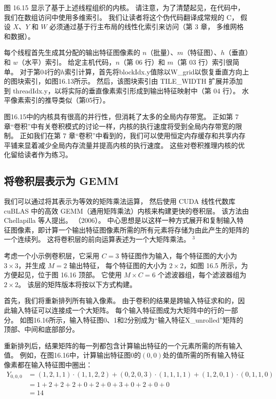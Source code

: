图 16.15 显示了基于上述线程组织的内核。 请注意，为了清楚起见，在代码中，我们在数组访问中使用多维索引。 
我们让读者将这个伪代码翻译成常规的 $\mathrm{C}$，
假设 $X、Y$ 和 $W$ 必须通过基于行主布局的线性化索引来访问（第 3 章， 多维网格和数据）。

每个线程首先生成其分配的输出特征图像素的 $n$（批量）、$m$（特征图）、$h$（垂直）和 $w$（水平）索引。 
给定主机代码，$n$（第 06 行）和 $m$（第 03 行）索引很简单。 
对于第04行的$h$索引计算，首先将blockIdx.y值除以W\_grid以恢复垂直方向上的图块索引，如图16.13所示。 
然后，该图块索引由 TILE\_WIDTH 扩展并添加到 threadIdx.y，以将实际的垂直像素索引形成到输出特征映射中（第 04 行）。 
水平像素索引的推导类似（第05行）。

图16.15中的内核具有很高的并行性，但消耗了太多的全局内存带宽。 
正如第 7 章“卷积”中有关卷积模式的讨论一样，内核的执行速度将受到全局内存带宽的限制。 
正如我们在第 7 章“卷积”中看到的，我们可以使用恒定内存缓存和共享内存平铺来显着减少全局内存流量并提高内核的执行速度。 
这些对卷积推理内核的优化留给读者作为练习。

\subsection{将卷积层表示为 GEMM}
我们可以通过将其表示为等效的矩阵乘法运算，
然后使用 CUDA 线性代数库 cuBLAS 中的高效 GEMM（通用矩阵乘法）内核来构建更快的卷积层。 
该方法由 Chellapilla 等人提出。 （2006）。 
中心思想是以这样一种方式展开和复制输入特征图像素，即计算一个输出特征图像素所需的所有元素将存储为由此产生的矩阵的一个连续列。 
这将卷积层的前向运算表述为一个大矩阵乘法。 ${}^{3}$

考虑一个小示例卷积层，它采用 $C=3$ 特征图作为输入，每个特征图的大小为 $3 \times 3$，并生成 $M=2$ 输出特征，
每个特征图的大小为 $2 \times 2 $，如图 16.5 所示，为方便起见，位于图 16.16 顶部。 
它使用 $M \times C=6$ 个滤波器组，每个滤波器组为 $2 \times 2$。 该层的矩阵版本将按以下方式构建。

首先，我们将重新排列所有输入像素。 由于卷积的结果是跨输入特征求和的，因此输入特征可以连接成一个大矩阵。 
每个输入特征图成为大矩阵中的行的一部分。 
如图16.16所示，输入特征图0、1和2分别成为“输入特征X\_unrolled”矩阵的顶部、中间和底部部分。

重新排列后，结果矩阵的每一列都包含计算输出特征的一个元素所需的所有输入值。 
例如，在图16.16中，计算输出特征图0的$(0,0)$处的值所需的所有输入特征像素都在输入特征图中圈出：
$$
\begin{aligned}
Y_{0,0,0} & =(1,2,1,1) \cdot(1,1,2,2)+(0,2,0,3) \cdot(1,1,1,1 )+(1,2,0,1) \cdot(0,1,1,0) \\
& =1+2+2+2+0+2+0+3+0+2+0+0 \\
&=14
\end{aligned}
$$

